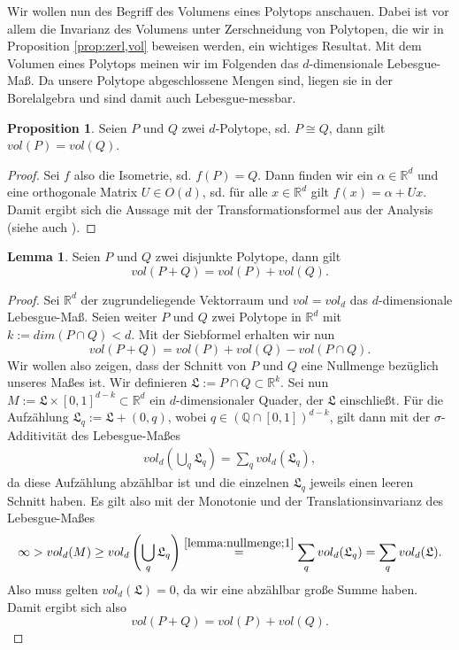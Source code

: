 \documentclass[11pt,titlepage]{article}
\newcommand{\setQ}{\mathbb{Q}}
\newcommand{\setR}{\mathbb{R}}
\theoremstyle{definition}
\newtheorem{proposition}[theorem]{Proposition}
\newtheorem{lemma}[theorem]{Lemma}
\theoremstyle{remark}
\begin{document}
	Wir wollen nun des Begriff des Volumens eines Polytops anschauen. Dabei ist 
	vor allem die Invarianz des Volumens unter Zerschneidung von Polytopen, die wir in Proposition \ref{prop:zerl,vol} beweisen werden, ein wichtiges Resultat. Mit dem Volumen eines Polytops meinen wir im Folgenden das 
	$d$-dimensionale Lebesgue-Maß. Da unsere Polytope abgeschlossene Mengen 
	sind, liegen sie in der Borelalgebra und sind damit auch Lebesgue-messbar.
	
	\begin{proposition} \label{prop:cong,vol}
		Seien $P$ und $Q$ zwei $d$-Polytope, sd. $P\cong Q$, dann gilt $vol(P)=vol(Q)$.
	\end{proposition}
	
	\begin{proof}
		Sei $f$ also die Isometrie, sd. $f(P)=Q$. Dann finden wir ein 
		$\alpha\in\setR^d$ und eine orthogonale Matrix $U\in O(d)$, sd. für 
		alle $x\in\setR^d$ gilt $f(x)=\alpha+Ux$. Damit ergibt sich die Aussage 
		mit der Transformationsformel 
		aus der Analysis (siehe auch \cite[Satz 4.7]{SkriptAna3}).
	\end{proof}
	
	\begin{lemma}\label{lemma:nullmenge}
		Seien $P$ und $Q$ zwei disjunkte Polytope, dann gilt
		\[ vol(P+Q)=vol(P)+vol(Q).\]
	\end{lemma}

	\begin{proof}
		Sei $\setR^d$ der zugrundeliegende Vektorraum und $vol=vol_d$ das $d$-dimensionale 
		Lebesgue-Maß. Seien weiter $P$ und $Q$ zwei Polytope in $\setR^d$ 
		mit $k:=dim(P\cap Q)<d$. Mit der Siebformel erhalten wir nun
		\[vol(P+Q)=vol(P)+vol(Q)-vol(P\cap Q).\]
		Wir wollen also zeigen, dass der Schnitt von $P$ und $Q$ eine Nullmenge bezüglich unseres Maßes ist. 
		Wir definieren $\mathfrak{L}:=P\cap Q \subset \setR^k$. Sei nun  $M:=\mathfrak{L}\times[0,1]^{d-k}\subset\setR^d$ ein $d$-dimensionaler Quader, der 
		$\mathfrak{L}$ einschließt. Für die Aufzählung $\mathfrak{L}_q:=\mathfrak{L}+(0,q)$, wobei $q\in(\setQ\cap[0,1])^{d-k}$, gilt dann mit der $\sigma$-Additivität des Lebesgue-Maßes
		\begin{align}
			vol_d \left(\bigcup_q\mathfrak{L}_q\right)=\sum_q vol_d(\mathfrak{L}_q), \label{lemma:nullmenge;1}
		\end{align}
		da diese Aufzählung abzählbar ist und die einzelnen $\mathfrak{L}_q$ jeweils einen leeren Schnitt haben. Es gilt also mit der Monotonie und der Translationsinvarianz des Lebesgue-Maßes
		\[\infty>vol_d(M)\geq vol_d\left(\bigcup_q \mathfrak{L}_q\right)\overset{\ref{lemma:nullmenge;1}}{=}\sum_q vol_d(\mathfrak{L}_q)=\sum_q vol_d(\mathfrak{L}).\]
		Also muss gelten $vol_d(\mathfrak{L})=0$, da wir eine abzählbar große Summe haben. 
		Damit ergibt sich also
		\[vol(P+Q)=vol(P)+vol(Q).\]
	\end{proof}
\end{document}
